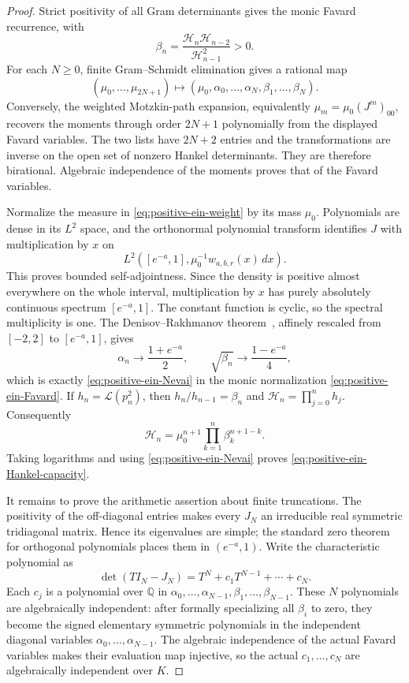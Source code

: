 \begin{proof}
Strict positivity of all Gram determinants gives the monic Favard
recurrence, with
\begin{equation}\label{eq:positive-ein-beta-Hankel}
 \beta_n=\frac{\mathcal H_n\mathcal H_{n-2}}
 {\mathcal H_{n-1}^2}>0.
\end{equation}
For each $N\geq0$, finite Gram--Schmidt elimination gives a rational map
\[
 (\mu_0,\ldots,\mu_{2N+1})
 \longmapsto
 (\mu_0,\alpha_0,\ldots,\alpha_N,
             \beta_1,\ldots,\beta_N).
\]
Conversely, the weighted Motzkin-path expansion, equivalently
$\mu_m=\mu_0(J^m)_{00}$, recovers the moments through order $2N+1$
polynomially from the displayed Favard variables.  The two lists have
$2N+2$ entries and the transformations are inverse on the open set of
nonzero Hankel determinants.  They are therefore birational.  Algebraic
independence of the moments proves that of the Favard variables.

Normalize the measure in \eqref{eq:positive-ein-weight} by its mass
$\mu_0$.  Polynomials are dense in its $L^2$ space, and the orthonormal
polynomial transform identifies $J$ with multiplication by $x$ on
\[
 L^2\!\left([e^{-a},1],\mu_0^{-1}w_{a,b,r}(x)\,dx\right).
\]
This proves bounded self-adjointness.  Since the density is positive
almost everywhere on the whole interval, multiplication by $x$ has
purely absolutely continuous spectrum $[e^{-a},1]$.  The constant
function is cyclic, so the spectral multiplicity is one.  The
Denisov--Rakhmanov theorem~\cite{Denisov2004}, affinely rescaled from $[-2,2]$ to
$[e^{-a},1]$, gives
\[
 \alpha_n\to\frac{1+e^{-a}}2,
 \qquad
 \sqrt{\beta_n}\to\frac{1-e^{-a}}4,
\]
which is exactly \eqref{eq:positive-ein-Nevai} in the monic
normalization \eqref{eq:positive-ein-Favard}.
If $h_n=\mathcal L(p_n^2)$, then
$h_n/h_{n-1}=\beta_n$ and
$\mathcal H_n=\prod_{j=0}^nh_j$.  Consequently
\[
 \mathcal H_n
 =\mu_0^{n+1}\prod_{k=1}^n\beta_k^{n+1-k}.
\]
Taking logarithms and using \eqref{eq:positive-ein-Nevai} proves
\eqref{eq:positive-ein-Hankel-capacity}.

It remains to prove the arithmetic assertion about finite truncations.
The positivity of the off-diagonal entries makes every $J_N$ an
irreducible real symmetric tridiagonal matrix.  Hence its eigenvalues are
simple; the standard zero theorem for orthogonal polynomials places them
in $(e^{-a},1)$.  Write the characteristic polynomial as
\[
 \det(TI_N-J_N)=T^N+c_1T^{N-1}+\cdots+c_N.
\]
Each $c_j$ is a polynomial over $\mathbb Q$ in
$\alpha_0,\ldots,\alpha_{N-1},\beta_1,\ldots,\beta_{N-1}$.
These $N$ polynomials are algebraically independent: after formally
specializing all $\beta_i$ to zero, they become the signed elementary
symmetric polynomials in the independent diagonal variables
$\alpha_0,\ldots,\alpha_{N-1}$.  The algebraic independence of the
actual Favard variables makes their evaluation map injective, so the
actual $c_1,\ldots,c_N$ are algebraically independent over $K$.


\end{proof}
